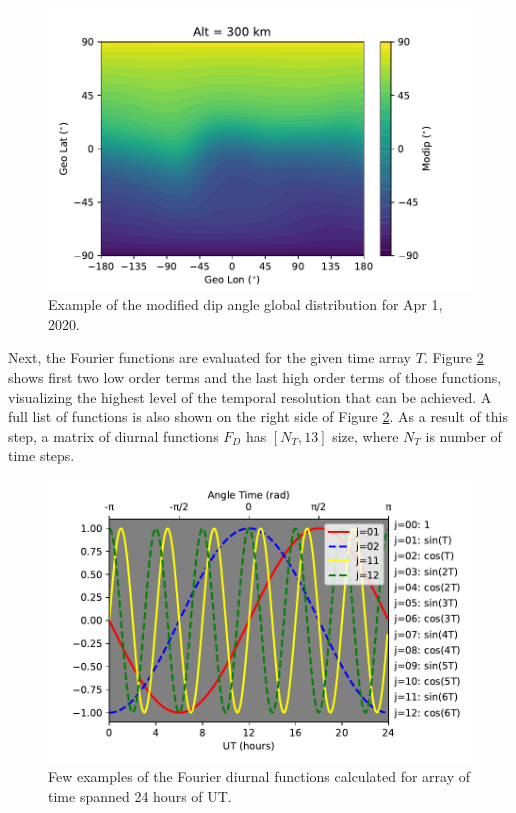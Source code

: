 \documentclass[draft]{agujournal2019}
\begin{document}
\begin{figure}[H]
  \includegraphics[scale=0.8]{PyIRI_modip.pdf}
  \caption{Example of the modified dip angle global distribution for Apr 1, 2020.}
  \label{fig:modip}
\end{figure}

Next, the Fourier functions are evaluated for the given time array $T$. Figure \ref{fig:diurnal} shows first two low order terms and the last high order terms of those functions, visualizing the highest level of the temporal resolution that can be achieved. A full list of functions is also shown on the right side of Figure \ref{fig:diurnal}. As a result of this step, a matrix of diurnal functions $F_D$ has $[N_T, 13]$ size, where $N_T$ is number of time steps.

\begin{figure}[H]
  \includegraphics[scale=0.9]{NIDA_diurnal_functions.pdf}
  \caption{Few examples of the Fourier diurnal functions calculated for array of time spanned 24 hours of UT.}
  \label{fig:diurnal}
\end{figure}
\end{document}
